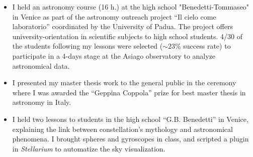 \begin{experiences}
{\begin{itemize}
     \end{itemize}}
    \emptySeparator
     {}{
     \begin{itemize}
         \item I held an astronomy course (16 h.) at the high school "Benedetti-Tommaseo" in Venice as part of the astronomy outreach project ``Il cielo come laboratorio'' coordinated by the University of Padua. The project offers university-orientation in scientific subjects to high school students. 4/30 of the students following my lessons were selected ($\sim 23 \%$ success rate) to participate in a 4-days stage at the Asiago observatory to analyze astronomical data.   %
     \end{itemize}}
    \emptySeparator
     {}{
     \begin{itemize}
         \item I presented my master thesis work to the general public in the ceremony where I was awarded the ``Geppina Coppola'' prize for best master thesis in astronomy in Italy.
     \end{itemize}}
     \emptySeparator
     {}{
     \begin{itemize}
         \item I held two lessons to students in the high school ``G.B. Benedetti'' in Venice, explaining the link between constellation's mythology and astronomical phenomena. %
         I brought spheres and gyroscopes in class, and scripted a plugin in \emph{Stellarium} to automatize the sky visualization.
     \end{itemize}}

\end{experiences}
